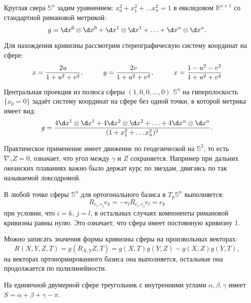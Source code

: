 Круглая свера $\mathbb{S}^n$ задим уравнением: $x_0^2 + x_1^2 + \ldots x_n^2 = 1$ в евклидовом $\mathbb{R}^{n+1}$ со стандартной римановой метрикой:
\begin{equation*}
	g = \d x^0 \otimes \d x^0 + \d x^1 \otimes \d x^1 + \ldots + \d x^n \otimes \d x^n.
\end{equation*}
 
 Для нахождения кривизны рассмотрим стереографическую систему координат на сфере:
 \begin{equation*}
 	x =	\frac{2 u}{1 + u^2 + v^2},
 	\hspace*{1 cm}
 	y =	\frac{2 v}{1 + u^2 + v^2},
 	\hspace*{1 cm}
 	x =	\frac{1 - u^2 - v^2}{1 + u^2 + v^2}
 \end{equation*}

 \begin{to_tas}
 	Центральная проекция из полюса сферы $(1,0,0,\ldots, 0)$ $\mathbb{S}^n$ на гиперплоскость $\{x_0 = 0\}$ задаёт систему координат на сфере без одной точки, в которой метрика имеет вид:
 	\begin{equation*}
 		g = \frac{4 \d x^1 \otimes \d x^1 + 4 \d x^2 \otimes \d x^2 + \ldots + 4 \d x^n \otimes \d x^n}{(1 + x_1^2 + \ldots x_n^2)^2}.
 	\end{equation*}
 \end{to_tas}

Практическое применение имеет движение по геодезической на $\mathbb{S}^2$, то есть $\nabla_{\dot{\gamma}} Z = 0$, означает, что угол между $\dot{\gamma}$ и $Z$ сохраняется. Например при дальних океанских плаваниях важно было держат курс по звездам, двигаясь по так называемой локсодромой.

\begin{to_thr}
	В любой точке сферы $\mathbb{S}^n $ для ортогонального базиса в $T_p \mathbb{S}^n $ выполняется:
	\begin{equation*}
		R_{e_i, e_j} e_k = - e_l R_{e_i,e_j}e_l = e_k
	\end{equation*}
	при условии, что $i=k,\,j=l$, в остальных случаях компоненты римановой кривизны равны нулю. Это означает, что сфера имеет постоянную кривизну 1.
\end{to_thr}

Можно записать значения формы кривизны сферы на произвольных векторах:
\begin{equation*}
	R(X,Y,Z,T) = g(R_{X,Y}Z, T) = g(X,T) g(Y,Z) - g(X,Z) g(Y,T),
\end{equation*}
на векторах ортонормированного базиса она выполняется, остальные она продолжается по полилинейности.

\begin{to_tas}
	На единичной двумерной сфере треугольник с внутренними углами $\alpha, \beta,\gamma$ имеет $S = \alpha + \beta + \gamma -\pi$.
\end{to_tas}
